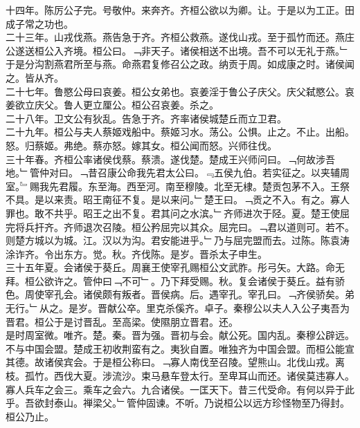 \documentclass{zhvt-classic}
\begin{document}
\hspace*{2em}十四年。陈厉公子完。号敬仲。来奔齐。齐桓公欲以为卿。让。于是以为工正。田成子常之功也。\\
\hspace*{2em}二十三年。山戎伐燕。燕告急于齐。齐桓公救燕。遂伐山戎。至于孤竹而还。燕庄公遂送桓公入齐境。桓公曰。﹁非天子。诸侯相送不出境。吾不可以无礼于燕。﹂于是分沟割燕君所至与燕。命燕君复修召公之政。纳贡于周。如成康之时。诸侯闻之。皆从齐。\\
\hspace*{2em}二十七年。鲁愍公母曰哀姜。桓公女弟也。哀姜淫于鲁公子庆父。庆父弑愍公。哀姜欲立庆父。鲁人更立厘公。桓公召哀姜。杀之。\\
\hspace*{2em}二十八年。卫文公有狄乱。告急于齐。齐率诸侯城楚丘而立卫君。\\
\hspace*{2em}二十九年。桓公与夫人蔡姬戏船中。蔡姬习水。荡公。公惧。止之。不止。出船。怒。归蔡姬。弗绝。蔡亦怒。嫁其女。桓公闻而怒。兴师往伐。\\
\hspace*{2em}三十年春。齐桓公率诸侯伐蔡。蔡溃。遂伐楚。楚成王兴师问曰。﹁何故涉吾地。﹂管仲对曰。﹁昔召康公命我先君太公曰。﹃五侯九伯。若实征之。以夹辅周室。﹄赐我先君履。东至海。西至河。南至穆陵。北至无棣。楚贡包茅不入。王祭不具。是以来责。昭王南征不复。是以来问。﹂楚王曰。﹁贡之不入。有之。寡人罪也。敢不共乎。昭王之出不复。君其问之水滨。﹂齐师进次于陉。夏。楚王使屈完将兵扞齐。齐师退次召陵。桓公矜屈完以其众。屈完曰。﹁君以道则可。若不。则楚方城以为城。江。汉以为沟。君安能进乎。﹂乃与屈完盟而去。过陈。陈袁涛涂诈齐。令出东方。觉。秋。齐伐陈。是岁。晋杀太子申生。\\
\hspace*{2em}三十五年夏。会诸侯于葵丘。周襄王使宰孔赐桓公文武胙。彤弓矢。大路。命无拜。桓公欲许之。管仲曰﹁不可﹂。乃下拜受赐。秋。复会诸侯于葵丘。益有骄色。周使宰孔会。诸侯颇有叛者。晋侯病。后。遇宰孔。宰孔曰。﹁齐侯骄矣。弟无行。﹂从之。是岁。晋献公卒。里克杀傒齐。卓子。秦穆公以夫人入公子夷吾为晋君。桓公于是讨晋乱。至高梁。使隰朋立晋君。还。\\
\hspace*{2em}是时周室微。唯齐。楚。秦。晋为强。晋初与会。献公死。国内乱。秦穆公辟远。不与中国会盟。楚成王初收荆蛮有之。夷狄自置。唯独齐为中国会盟。而桓公能宣其德。故诸侯宾会。于是桓公称曰。﹁寡人南伐至召陵。望熊山。北伐山戎。离枝。孤竹。西伐大夏。涉流沙。束马悬车登太行。至卑耳山而还。诸侯莫违寡人。寡人兵车之会三。乘车之会六。九合诸侯。一匡天下。昔三代受命。有何以异于此乎。吾欲封泰山。禅梁父。﹂管仲固谏。不听。乃说桓公以远方珍怪物至乃得封。桓公乃止。\\
\end{document}

